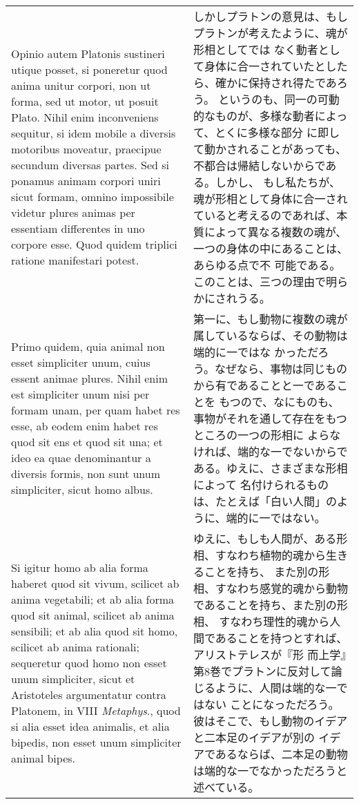 \documentclass[paper=a4paper,fontsize=10pt,jafontsize=9pt,titlepage]{jlreq}
\begin{document}
\begin{longtable}{p{21em}p{21em}}
\\

Opinio autem Platonis sustineri utique posset, si poneretur quod anima
unitur corpori, non ut forma, sed ut motor, ut posuit Plato. Nihil
enim inconveniens sequitur, si idem mobile a diversis motoribus
moveatur, praecipue secundum diversas partes. Sed si ponamus animam
corpori uniri sicut formam, omnino impossibile videtur plures animas
per essentiam differentes in uno corpore esse. Quod quidem triplici
ratione manifestari potest.

&

しかしプラトンの意見は、もしプラトンが考えたように、魂が形相としてでは
なく動者として身体に合一されていたとしたら、確かに保持され得たであろう。
というのも、同一の可動的なものが、多様な動者によって、とくに多様な部分
に即して動かされることがあっても、不都合は帰結しないからである。しかし、
もし私たちが、魂が形相として身体に合一されていると考えるのであれば、本
質によって異なる複数の魂が、一つの身体の中にあることは、あらゆる点で不
可能である。このことは、三つの理由で明らかにされうる。
 
\\

Primo quidem, quia animal non esset simpliciter unum, cuius essent
animae plures. Nihil enim est simpliciter unum nisi per formam unam,
per quam habet res esse, ab eodem enim habet res quod sit ens et quod
sit una; et ideo ea quae denominantur a diversis formis, non sunt unum
 simpliciter, sicut homo albus.

&

第一に、もし動物に複数の魂が属しているならば、その動物は端的に一ではな
かっただろう。なぜなら、事物は同じものから有であることと一であることを
もつので、なにものも、事物がそれを通して存在をもつところの一つの形相に
よらなければ、端的な一でないからである。ゆえに、さまざまな形相によって
名付けられるものは、たとえば「白い人間」のように、端的に一ではない。
 
\\

 Si igitur homo ab alia forma haberet
quod sit vivum, scilicet ab anima vegetabili; et ab alia forma quod
sit animal, scilicet ab anima sensibili; et ab alia quod sit homo,
scilicet ab anima rationali; sequeretur quod homo non esset unum
simpliciter, sicut et Aristoteles argumentatur contra Platonem, in
VIII {\itshape Metaphys}., quod si alia esset idea animalis, et alia bipedis, non
 esset unum simpliciter animal bipes.

&

ゆえに、もしも人間が、ある形相、すなわち植物的魂から生きることを持ち、
また別の形相、すなわち感覚的魂から動物であることを持ち、また別の形相、
すなわち理性的魂から人間であることを持つとすれば、アリストテレスが『形
而上学』第8巻でプラトンに反対して論じるように、人間は端的な一ではない
ことになっただろう。彼はそこで、もし動物のイデアと二本足のイデアが別の
イデアであるならば、二本足の動物は端的な一でなかっただろうと述べている。
 

\end{longtable}
\end{document}
